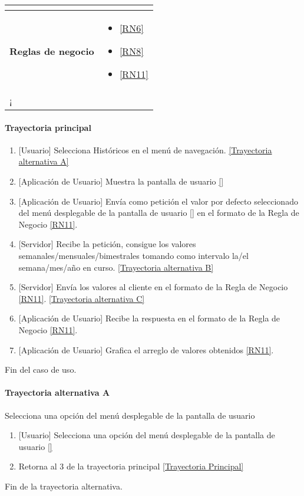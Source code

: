 \begin{longtable}{|J{5cm}|J{10.3cm}|}
\begin{itemize}
		\end{itemize} \\ \hline
	\textbf{Reglas de negocio} & 
		\begin{itemize}
		    \item \ref{RN6}
			\item \ref{RN8}
			\item \ref{RN11}
		\end{itemize} \\ \hline
¡
\end{longtable}

\paragraph{Trayectoria principal}
    \label{SUB-M-CU1.5:TP}
	\begin{enumerate}
	    \item {[Usuario]} Selecciona Históricos en el menú de navegación. \hyperref[SUB-M-CU6:TA]{[Trayectoria alternativa A]} 
	    \item {[Aplicación de Usuario]} Muestra la pantalla de usuario \ref{}
		\item {[Aplicación de Usuario]} Envía como petición el valor por defecto seleccionado del menú desplegable de la pantalla de usuario \ref{} en el formato de la Regla de Negocio \ref{RN11}. 
		\item {[Servidor]} Recibe la petición, consigue los valores semanales/mensuales/bimestrales tomando como intervalo la/el semana/mes/año en curso. \hyperref[SUB-M-CU5:TB]{[Trayectoria alternativa B]} 
		\item {[Servidor]} Envía los valores al cliente en el formato de la Regla de Negocio \ref{RN11}. \hyperref[SUB-M-CU5:TC]{[Trayectoria alternativa C]}
        \item {[Aplicación de Usuario]} Recibe la respuesta en el formato de la Regla de Negocio \ref{RN11}. 
        \item {[Aplicación de Usuario]} Grafica el arreglo de valores obtenidos \ref{RN11}. 
	\end{enumerate}
	Fin del caso de uso.

\paragraph{Trayectoria alternativa A} \label{SUB-M-CU6:TA}
    Selecciona una opción del menú desplegable de la pantalla de usuario
	\begin{enumerate}[label=A\arabic*.]
	    \item {[Usuario]} Selecciona una opción del menú desplegable de la pantalla de usuario \ref{}
	    \item Retorna al 3 de la trayectoria principal \hyperref[SUB-M-CU6:TP]{[Trayectoria Principal]}
	\end{enumerate}
	Fin de la trayectoria alternativa.
	
